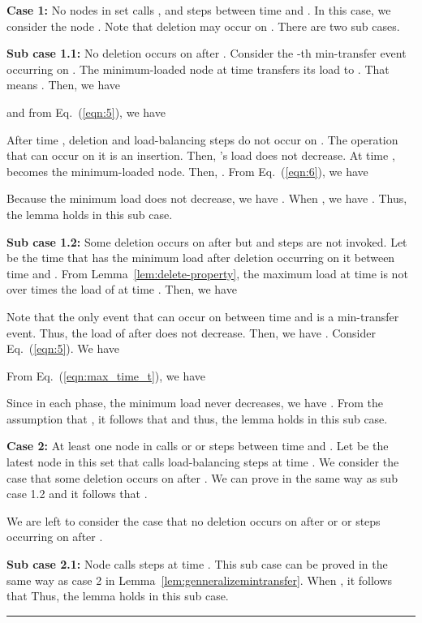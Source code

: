 \documentclass[a4paper]{article}
\newenvironment{proof}{{\bf Proof:}}{\hfill\rule{1.5mm}{3mm}\vspace{0.1in}}
\begin{document}
\begin{proof}
  \textbf{Case 1:} No nodes in set  calls {\minbalance},
  {\splitmax} and {\splitnbr} steps between time  and
  . In this case, we consider the node . Note that deletion may occur on .  
  There are two sub cases.

  \textbf{Sub case 1.1:} No deletion occurs on  after .
  Consider the -th min-transfer event occurring on . The minimum-loaded
  node at time  transfers its load to . That means
  . Then, we have


and from Eq.~(\ref{eqn:5}), we have



After time , deletion and load-balancing steps do not occur on
.  The operation that can occur on it is an insertion. Then, 's
load does not decrease.  At time ,  becomes the minimum-loaded
node. Then, .  From Eq.~(\ref{eqn:6}), we
have



Because the minimum load does not decrease, we have . When , we have
. Thus, the
lemma holds in this sub case.

\textbf{Sub case 1.2:} Some deletion occurs on  after  but
{\splitmax} and {\splitnbr} steps are not invoked. Let  be the
time that  has the minimum load after deletion occurring on it
between time  and . From Lemma~\ref{lem:delete-property},
the maximum load at time  is not over  times  the load of
 at time .  Then, we have


 Note that the only event that can occur on  between time 
 and  is a min-transfer event. Thus, the load of  after 
 does not decrease. Then, we have . Consider
 Eq.~(\ref{eqn:5}). We have

 

 From Eq.~(\ref{eqn:max_time_t}), we have 
  
 Since in each phase, the minimum load never
 decreases, we have . From the assumption that , it follows that
  and thus, the lemma holds in this sub case.

 \textbf{Case 2:} At least one node in  calls {\minbalance}
 or {\splitmax} or {\splitnbr} steps between time  and
 .  Let  be the latest node in this set that calls 
 load-balancing steps at time .  We consider the case that
 some deletion occurs on  after . We can prove in the same
 way as sub case 1.2 and it follows that .
       
 We are left to consider the case that no deletion occurs on  after
  {\minbalance} or {\splitnbr} or {\splitmax} steps occurring on 
 after .

 \textbf{Sub case 2.1:} Node  calls {\minbalance} steps at time
 . This sub case can be proved in the same way as case 2 in
 Lemma~\ref{lem:genneralizemintransfer}. When ,
 it follows that 
 Thus, the lemma holds in this sub case.


\end{proof}
\end{document}
